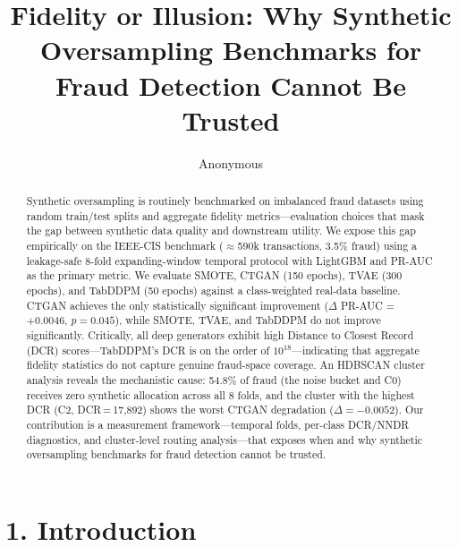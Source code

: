 \documentclass[sigconf]{acmart}
\title{Fidelity or Illusion: Why Synthetic Oversampling Benchmarks for Fraud Detection Cannot Be Trusted}
\author{Anonymous}
\begin{document}
\begin{abstract}
Synthetic oversampling is routinely benchmarked on imbalanced fraud datasets using random train/test splits and aggregate fidelity metrics---evaluation choices that mask the gap between synthetic data quality and downstream utility. We expose this gap empirically on the IEEE-CIS benchmark ($\approx$590k transactions, 3.5\% fraud) using a leakage-safe 8-fold expanding-window temporal protocol with LightGBM and PR-AUC as the primary metric. We evaluate SMOTE, CTGAN (150 epochs), TVAE (300 epochs), and TabDDPM (50 epochs) against a class-weighted real-data baseline. CTGAN achieves the only statistically significant improvement ($\Delta$ PR-AUC = $+0.0046$, $p = 0.045$), while SMOTE, TVAE, and TabDDPM do not improve significantly. Critically, all deep generators exhibit high Distance to Closest Record (DCR) scores---TabDDPM's DCR is on the order of $10^{18}$---indicating that aggregate fidelity statistics do not capture genuine fraud-space coverage. An HDBSCAN cluster analysis reveals the mechanistic cause: 54.8\% of fraud (the noise bucket and C0) receives zero synthetic allocation across all 8 folds, and the cluster with the highest DCR (C2, DCR\,=\,17,892) shows the worst CTGAN degradation ($\Delta = -0.0052$). Our contribution is a measurement framework---temporal folds, per-class DCR/NNDR diagnostics, and cluster-level routing analysis---that exposes when and why synthetic oversampling benchmarks for fraud detection cannot be trusted.
\end{abstract}
\maketitle


\section{1. Introduction}
\end{document}
